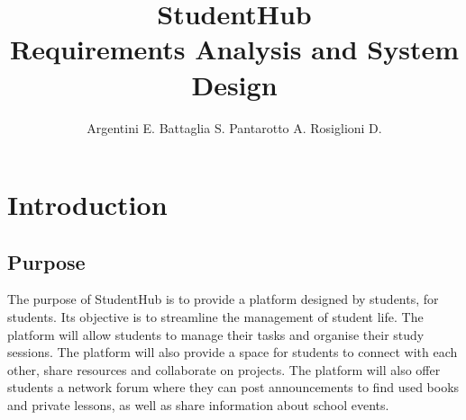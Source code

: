 \documentclass{article}
\title{\Huge\bfseries StudentHub \\ [0.2em]\large Requirements Analysis and System Design}
\author{\Large Argentini E. Battaglia S. Pantarotto A. Rosiglioni D.}
\begin{document}
\maketitle
\clearpage
\tableofcontents
\clearpage

\section{Introduction}
\subsection{Purpose}
The purpose of StudentHub is to provide a platform designed by students, for students. Its objective is to streamline the management of student life. The platform will allow students to manage their tasks and organise their study sessions. The platform will also provide a space for students to connect with each other, share resources and collaborate on projects. The platform will also offer students a network forum where they can post announcements to find used books and private lessons, as well as share information about school events.
\end{document}
